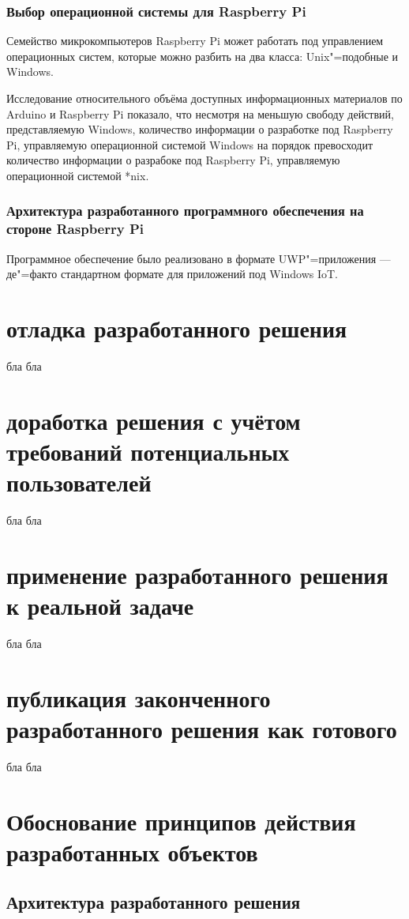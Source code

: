 \subsubsection{Выбор операционной системы для Raspberry Pi}
Семейство микрокомпьютеров Raspberry Pi может работать под управлением операционных систем, которые можно разбить на два класса: Unix"=подобные и Windows.

Исследование относительного объёма доступных информационных материалов по Arduino и Raspberry Pi показало, что несмотря на меньшую свободу действий, представляемую Windows, количество информации о разработке под Raspberry Pi, управляемую операционной системой Windows на порядок превосходит количество информации о разрабоке под Raspberry Pi, управляемую операционной системой *nix. 

\subsubsection{Архитектура разработанного программного обеспечения на стороне Raspberry Pi}
Программное обеспечение было реализовано в формате UWP"=приложения --- де"=факто стандартном формате для приложений под Windows IoT.

\section{отладка разработанного решения}
бла бла
\section{доработка решения с учётом требований потенциальных пользователей}
бла бла
\section{применение разработанного решения к реальной задаче}
бла бла
\section{публикация законченного разработанного решения как готового}
бла бла

\section{Обоснование принципов действия разработанных объектов}
\subsection{Архитектура разработанного решения}

